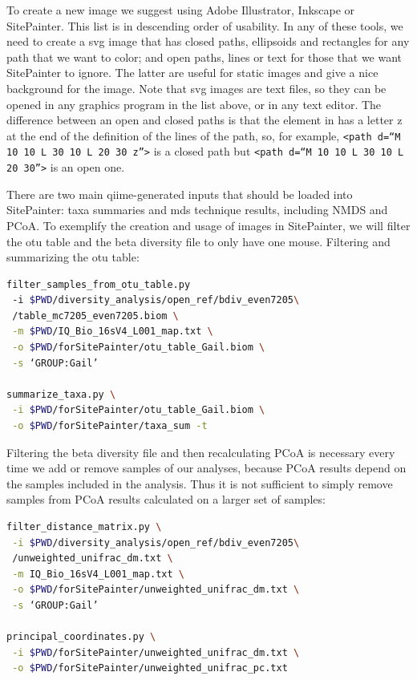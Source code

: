 To create a new image we suggest using Adobe Illustrator, Inkscape or SitePainter. This list is in descending
order of usability. In any of these tools, we need to create a \gls{svg} image that has closed paths, ellipsoids
and rectangles for any path that we want to color; and open paths, lines or text for those that we want SitePainter
to ignore. The latter are useful for static images and give a nice background for the image. Note that \gls{svg}
images are text files, so they can be opened in any graphics program in the list above, or in any text editor.
The difference between an open and closed paths is that the element in has a letter z at the end of the definition
of the lines of the path, so, for example, \texttt{<path d=“M 10 10 L 30 10 L 20 30 z”>} is a closed path but
\texttt{<path d=“M 10 10 L 30 10 L 20 30”>} is an open one.

There are two main \gls{qiime}-generated inputs that should be loaded into SitePainter: taxa summaries and
\gls{mds} technique results, including NMDS and PCoA. To exemplify the creation and usage of images in
SitePainter, we will filter the \gls{otu} table and the beta diversity file to only have one mouse.
Filtering and summarizing the \gls{otu} table:

\begin{lstlisting}[language=bash]
filter_samples_from_otu_table.py
 -i $PWD/diversity_analysis/open_ref/bdiv_even7205\
 /table_mc7205_even7205.biom \
 -m $PWD/IQ_Bio_16sV4_L001_map.txt \
 -o $PWD/forSitePainter/otu_table_Gail.biom \
 -s ‘GROUP:Gail’

summarize_taxa.py \
 -i $PWD/forSitePainter/otu_table_Gail.biom \
 -o $PWD/forSitePainter/taxa_sum -t
\end{lstlisting}

Filtering the beta diversity file and then recalculating PCoA is necessary every time we add or remove
samples of our analyses, because PCoA results depend on the samples included in the analysis. Thus it is
not sufficient to simply remove samples from PCoA results calculated on a larger set of samples:

\begin{lstlisting}[language=bash]
filter_distance_matrix.py \
 -i $PWD/diversity_analysis/open_ref/bdiv_even7205\
 /unweighted_unifrac_dm.txt \
 -m IQ_Bio_16sV4_L001_map.txt \
 -o $PWD/forSitePainter/unweighted_unifrac_dm.txt \
 -s ‘GROUP:Gail’

principal_coordinates.py \
 -i $PWD/forSitePainter/unweighted_unifrac_dm.txt \
 -o $PWD/forSitePainter/unweighted_unifrac_pc.txt
\end{lstlisting}

